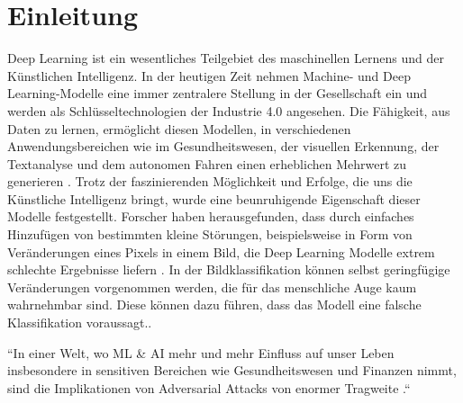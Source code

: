 \section{Einleitung} 

Deep Learning ist ein wesentliches Teilgebiet des maschinellen Lernens und der Künstlichen Intelligenz. In der heutigen Zeit nehmen Machine- und Deep Learning-Modelle eine immer zentralere Stellung in der Gesellschaft ein und werden als Schlüsseltechnologien der Industrie 4.0 angesehen. Die Fähigkeit, aus Daten zu lernen, ermöglicht diesen Modellen, in verschiedenen Anwendungsbereichen wie im Gesundheitswesen, der visuellen Erkennung, der Textanalyse und dem autonomen Fahren einen erheblichen Mehrwert zu generieren \cite{sarker_deep_2021}. Trotz der faszinierenden Möglichkeit und Erfolge, die uns die Künstliche Intelligenz bringt, wurde eine beunruhigende Eigenschaft dieser Modelle festgestellt. Forscher haben herausgefunden, dass durch einfaches Hinzufügen von bestimmten kleine Störungen, beispielsweise in Form von Veränderungen eines Pixels in einem Bild, die Deep Learning Modelle extrem schlechte Ergebnisse liefern \cite{szegedy_intriguing_2014}. In der Bildklassifikation können selbst geringfügige Veränderungen vorgenommen werden, die für das menschliche Auge kaum wahrnehmbar sind. Diese können dazu führen, dass das Modell eine falsche Klassifikation voraussagt.\cite{perruchoud_24fs_i4ds27_2023}. 

``In einer Welt, wo ML \& AI mehr und mehr Einfluss auf unser Leben insbesondere in sensitiven Bereichen wie Gesundheitswesen und Finanzen nimmt, sind die Implikationen von Adversarial Attacks von enormer Tragweite \cite{perruchoud_24fs_i4ds27_2023}.`` 